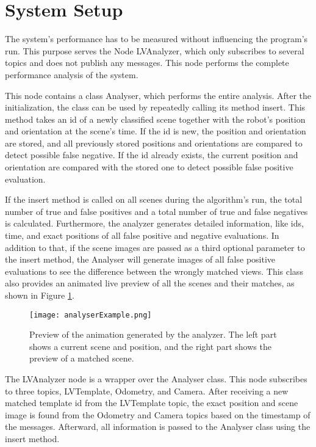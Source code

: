 \section{System Setup}\label{section:SystemSetup}

The system's performance has to be measured without influencing the program's run. This purpose serves the Node LVAnalyzer, which only subscribes to several topics and does not publish any messages. This node performs the complete performance analysis of the system.\par
This node contains a class Analyser, which performs the entire analysis. After the initialization, the class can be used by repeatedly calling its method insert. This method takes an id of a newly classified scene together with the robot's position and orientation at the scene's time. If the id is new, the position and orientation are stored, and all previously stored positions and orientations are compared to detect possible false negative. If the id already exists, the current position and orientation are compared with the stored one to detect possible false positive evaluation.\par
If the insert method is called on all scenes during the algorithm's run, the total number of true and false positives and a total number of true and false negatives is calculated. Furthermore, the analyzer generates detailed information, like ids, time, and exact positions of all false positive and negative evaluations. In addition to that, if the scene images are passed as a third optional parameter to the insert method, the Analyser will generate images of all false positive evaluations to see the difference between the wrongly matched views. This class also provides an animated live preview of all the scenes and their matches, as shown in Figure \ref{fig:analExample}.\par

\begin{figure}[htpb]
    \centering
    \texttt{[image: analyserExample.png]}
    \caption[Preview of the animation generated by the analyzer]{Preview of the animation generated by the analyzer. The left part shows a current scene and position, and the right part shows the preview of a matched scene.} \label{fig:analExample}
\end{figure}

The LVAnalyzer node is a wrapper over the Analyser class. This node subscribes to three topics, LVTemplate, Odometry, and Camera. After receiving a new matched template id from the LVTemplate topic, the exact position and scene image is found from the Odometry and Camera topics based on the timestamp of the messages. Afterward, all information is passed to the Analyser class using the insert method.
